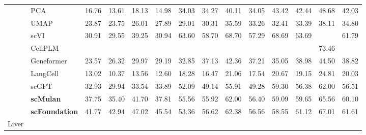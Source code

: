 \begin{table}[htbp]
\begin{tabular}{llcccccccccccc}
      & PCA      &   16.76 &   13.61 &   18.13 &   14.98 &   34.03 &   34.27 &   40.11 &   34.05 &   43.42 &   42.44 &   48.68 &   42.03  \\
      & UMAP      &   23.87 &   23.75 &   26.01 &   27.89 &   29.01 &   30.31 &   35.59 &   33.26 &   32.41 &   33.39 &   38.11 &   34.80  \\
      & scVI      &   30.91 &   29.55 &   39.25 &   30.94 &   63.60 &   58.70 &   68.70 &   57.29 &   68.69 &   63.69 & \cellcolor{gray!25}{73.72} &   61.79  \\
      & CellPLM      & \cellcolor{gray!25}{52.78} & \cellcolor{gray!25}{50.97} & \cellcolor{gray!25}{55.26} & \cellcolor{gray!25}{53.51} & \cellcolor{gray!25}{65.31} & \cellcolor{gray!25}{65.25} & \cellcolor{gray!25}{70.26} & \cellcolor{gray!25}{65.09} & \cellcolor{gray!25}{69.28} & \cellcolor{gray!25}{68.02} &   73.46 & \cellcolor{gray!25}{68.12}  \\
      & Geneformer      &   23.57 &   26.32 &   29.97 &   29.19 &   32.85 &   37.13 &   42.36 &   37.21 &   35.05 &   38.98 &   44.50 &   38.82  \\
      & LangCell      &   13.02 &   10.37 &   13.56 &   12.60 &   18.28 &   16.47 &   21.06 &   17.54 &   20.67 &   19.15 &   24.81 &   20.03  \\
      & scGPT      &   32.93 &   29.94 &   33.54 &   33.89 &   52.09 &   49.14 &   55.91 &   49.28 &   59.30 &   56.38 &   62.00 &   56.51  \\
      & \cellcolor{gray!25}\textbf{scMulan}      &   37.75 &   35.40 &   41.70 &   37.81 &   55.56 &   55.92 &   62.00 &   56.40 &   59.09 &   59.65 &   65.56 &   60.10  \\
      & \cellcolor{gray!25}\textbf{scFoundation}      &   41.77 &   42.94 &   47.02 &   45.54 &   53.36 &   56.62 &   62.38 &   56.56 &   58.55 &   61.12 &   67.01 &   61.61  \\
    \midrule

    \multirow{9}{*}{Liver}


\end{tabular}
\end{table}

